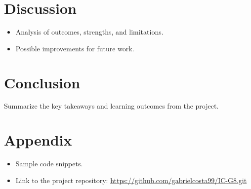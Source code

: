 \documentclass[a4paper,12pt]{article}
\begin{document}
\section{Discussion}
\begin{itemize}
    \item Analysis of outcomes, strengths, and limitations.
    \item Possible improvements for future work.
\end{itemize}

\section{Conclusion}
Summarize the key takeaways and learning outcomes from the project.

\section{Appendix}
\begin{itemize}
    \item Sample code snippets.
    \item Link to the project repository: \url{https://github.com/gabrielcosta99/IC-G8.git}
\end{itemize}
\end{document}
